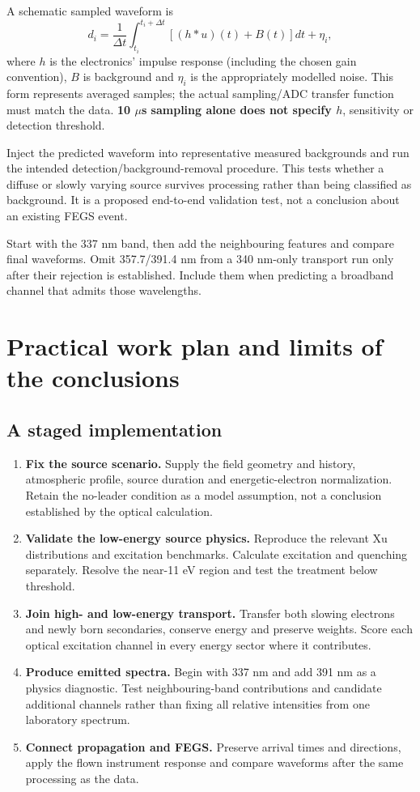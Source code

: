 \documentclass[11pt,a4paper]{article}
\newcommand{\nextsection}[1]{\clearpage\section{#1}}
\begin{document}
A schematic sampled waveform is
\begin{equation}
 d_i=\frac{1}{\Delta t}\int_{t_i}^{t_i+\Delta t}
 \left[(h*u)(t)+B(t)\right]dt+\eta_i,
 \label{eq:waveform}
\end{equation}
where $h$ is the electronics' impulse response (including the chosen gain convention), $B$ is background and $\eta_i$ is the appropriately modelled noise. This form represents averaged samples; the actual sampling/ADC transfer function must match the data. \textbf{10 $\mu$s sampling alone does not specify $h$}, sensitivity or detection threshold.

\begin{keybox}
Inject the predicted waveform into representative measured backgrounds and run the intended detection/background-removal procedure. This tests whether a diffuse or slowly varying source survives processing rather than being classified as background. It is a proposed end-to-end validation test, not a conclusion about an existing FEGS event.
\end{keybox}

Start with the 337 nm band, then add the neighbouring features and compare final waveforms. Omit 357.7/391.4 nm from a 340 nm-only transport run only after their rejection is established. Include them when predicting a broadband channel that admits those wavelengths.

\nextsection{Practical work plan and limits of the conclusions}
\label{sec:plan}
\subsection*{A staged implementation}
\begin{enumerate}
\item \textbf{Fix the source scenario.} Supply the field geometry and history, atmospheric profile, source duration and energetic-electron normalization. Retain the no-leader condition as a model assumption, not a conclusion established by the optical calculation.
\item \textbf{Validate the low-energy source physics.} Reproduce the relevant Xu distributions and excitation benchmarks. Calculate excitation and quenching separately. Resolve the near-11 eV region and test the treatment below threshold.
\item \textbf{Join high- and low-energy transport.} Transfer both slowing electrons and newly born secondaries, conserve energy and preserve weights. Score each optical excitation channel in every energy sector where it contributes.
\item \textbf{Produce emitted spectra.} Begin with 337 nm and add 391 nm as a physics diagnostic. Test neighbouring-band contributions and candidate additional channels rather than fixing all relative intensities from one laboratory spectrum.
\item \textbf{Connect propagation and FEGS.} Preserve arrival times and directions, apply the flown instrument response and compare waveforms after the same processing as the data.
\end{enumerate}
\end{document}
